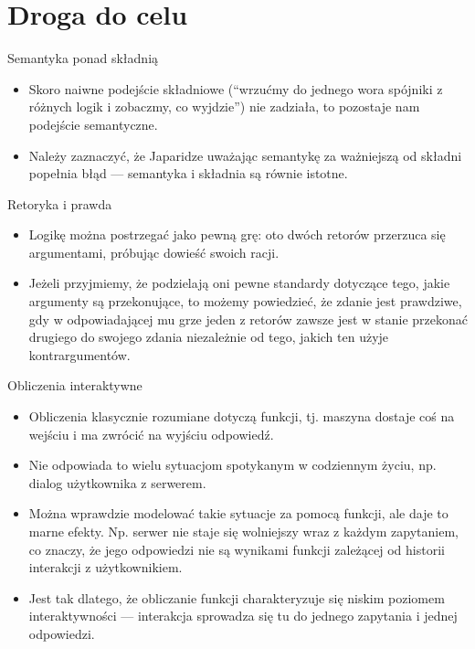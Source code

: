 \documentclass{beamer}
\begin{document}
\section{Droga do celu}

\begin{frame}{Semantyka ponad składnią}
\begin{itemize}
	\item Skoro naiwne podejście składniowe (``wrzućmy do jednego wora spójniki z różnych logik i zobaczmy, co wyjdzie'') nie zadziała, to pozostaje nam podejście semantyczne. \\
	\item Należy zaznaczyć, że Japaridze uważając semantykę za ważniejszą od składni popełnia błąd — semantyka i składnia są równie istotne.
\end{itemize}
\end{frame}

\begin{frame}{Retoryka i prawda}
\begin{itemize}
	\item Logikę można postrzegać jako pewną grę: oto dwóch retorów przerzuca się argumentami, próbując dowieść swoich racji.
	\item Jeżeli przyjmiemy, że podzielają oni pewne standardy dotyczące tego, jakie argumenty są przekonujące, to możemy powiedzieć, że zdanie jest prawdziwe, gdy w odpowiadającej mu grze jeden z retorów zawsze jest w stanie przekonać drugiego do swojego zdania niezależnie od tego, jakich ten użyje kontrargumentów.
\end{itemize}
\end{frame}

\begin{frame}{Obliczenia interaktywne}
\begin{itemize}
	\item Obliczenia klasycznie rozumiane dotyczą funkcji, tj. maszyna dostaje coś na wejściu i ma zwrócić na wyjściu odpowiedź.
	\item Nie odpowiada to wielu sytuacjom spotykanym w codziennym życiu, np. dialog użytkownika z serwerem.
	\item Można wprawdzie modelować takie sytuacje za pomocą funkcji, ale daje to marne efekty. Np. serwer nie staje się wolniejszy wraz z każdym zapytaniem, co znaczy, że jego odpowiedzi nie są wynikami funkcji zależącej od historii interakcji z użytkownikiem. 
	\item Jest tak dlatego, że obliczanie funkcji charakteryzuje się niskim poziomem interaktywności — interakcja sprowadza się tu do jednego zapytania i jednej odpowiedzi.
\end{itemize}
\end{frame}
\end{document}
